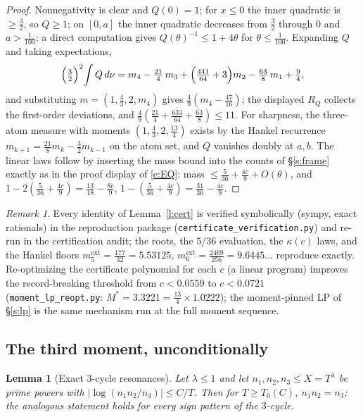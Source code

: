 \documentclass[11pt]{article}
\numberwithin{equation}{section}
\newtheorem{lemma}[theorem]{Lemma}
\theoremstyle{definition}
\theoremstyle{remark}
\newtheorem{remark}[theorem]{Remark}
\begin{document}
\begin{proof}
Nonnegativity is clear and $Q(0)=1$; for $x\le0$ the inner
quadratic is $\ge\tfrac32$, so $Q\ge1$; on $[0,a]$ the inner
quadratic decreases from $\tfrac32$ through $0$ and $a>\tfrac1{100}$;
a direct computation gives $Q(\theta)^{-1}\le1+4\theta$ for
$\theta\le\tfrac1{100}$. Expanding $Q$ and taking expectations,
\[
\Bigl(\tfrac32\Bigr)^2\!\int Q\,d\nu
=m_4-\tfrac{21}4\,m_3+\Bigl(\tfrac{441}{64}+3\Bigr)m_2
-\tfrac{63}8\,m_1+\tfrac94,
\]
and substituting $m=(1,\tfrac43,2,m_4)$ gives
$\tfrac49(m_4-\tfrac{47}{16})$; the displayed $R_Q$ collects the
first-order deviations, and
$\tfrac49(\tfrac{21}4+\tfrac{633}{64}+\tfrac{63}8)\le11$. For
sharpness, the three-atom measure with moments
$(1,\tfrac43,2,\tfrac{13}4)$ exists by the Hankel recurrence
$m_{k+1}=\tfrac{21}8m_k-\tfrac32m_{k-1}$ on the atom set, and $Q$
vanishes doubly at $a,b$. The linear laws follow by inserting the
mass bound into the counts of \S\ref{s:frame} exactly as in the
proof display of \eqref{e:EQ}: mass
$\le\tfrac5{36}+\tfrac{4c}9+O(\theta)$, and
$1-2(\tfrac5{36}+\tfrac{4c}9)=\tfrac{13}{18}-\tfrac{8c}9$,
$1-(\tfrac5{36}+\tfrac{4c}9)=\tfrac{31}{36}-\tfrac{4c}9$.
\end{proof}

\begin{remark}\label{r:certlp}
Every identity of Lemma~\ref{l:cert} is verified symbolically
(sympy, exact rationals) in the reproduction package
(\texttt{certificate\_verification.py}) and re-run in the
certification audit; the roots, the $5/36$ evaluation, the $\kappa(c)$
laws, and the Hankel floors $m_5^{\mathrm{ext}}=\tfrac{177}{32}
=5.53125$, $m_6^{\mathrm{ext}}=\tfrac{2469}{256}=9.6445\ldots$
reproduce exactly. Re-optimizing the certificate polynomial for
each $c$ (a linear program) improves the record-breaking
threshold from $c<0.0559$ to $c<0.0721$
(\texttt{moment\_lp\_reopt.py}: $M^{*}=3.3221=\tfrac{13}4
\times1.0222$); the moment-pinned LP of \S\ref{s:lp} is the same
mechanism run at the full moment sequence.
\end{remark}

\subsection{The third moment, unconditionally}\label{s:cert:m3}

\begin{lemma}[Exact $3$-cycle resonances]\label{l:m3res}
Let $\lambda\le1$ and let $n_1,n_2,n_3\le X=T^{\lambda}$ be prime
powers with $|\log(n_1n_2/n_3)|\le C/T$. Then for $T\ge T_0(C)$,
$n_1n_2=n_3$; the analogous statement holds for every sign
pattern of the $3$-cycle.
\end{lemma}
\end{document}

